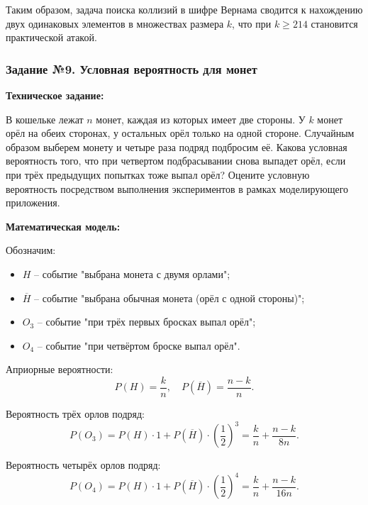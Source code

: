 \documentclass[a4paper]{article}
\theoremstyle{definition}
\begin{document}
Таким образом, задача поиска коллизий в шифре Вернама сводится к нахождению двух одинаковых элементов в множествах размера $k$, что при $k \ge 214$ становится практической атакой.

\subsubsection{Задание №9. Условная вероятность для монет}

\textbf{Техническое задание:}

В кошельке лежат $n$ монет, каждая из которых имеет две стороны. У $k$ монет орёл на обеих сторонах, у остальных орёл только на одной стороне. Случайным образом выберем монету и четыре раза подряд подбросим её. Какова условная вероятность того, что при четвертом подбрасывании снова выпадет орёл, если при трёх предыдущих попытках тоже выпал орёл? Оцените условную вероятность посредством выполнения экспериментов в рамках моделирующего приложения.

\textbf{Математическая модель:}

Обозначим:
\begin{itemize}
    \item $H$ – событие "выбрана монета с двумя орлами";
    \item $\overline{H}$ – событие "выбрана обычная монета (орёл с одной стороны)";
    \item $O_3$ – событие "при трёх первых бросках выпал орёл";
    \item $O_4$ – событие "при четвёртом броске выпал орёл".
\end{itemize}

Априорные вероятности:
\begin{equation}
    P(H) = \frac{k}{n}, \quad P(\overline{H}) = \frac{n-k}{n}. \tag{9.1}
\end{equation}

Вероятность трёх орлов подряд:
\begin{equation}
    P(O_3) = P(H) \cdot 1 + P(\overline{H}) \cdot \left(\frac{1}{2}\right)^3 = \frac{k}{n} + \frac{n-k}{8n}. \tag{9.2}
\end{equation}

Вероятность четырёх орлов подряд:
\begin{equation}
    P(O_4) = P(H) \cdot 1 + P(\overline{H}) \cdot \left(\frac{1}{2}\right)^4 = \frac{k}{n} + \frac{n-k}{16n}. \tag{9.3}
\end{equation}
\end{document}

